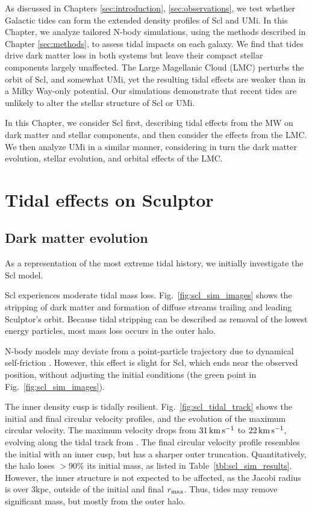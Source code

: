 As discussed in Chapters \ref{sec:introduction}, \ref{sec:observations},
we test whether Galactic tides can form the extended density profiles of
Scl and UMi. In this Chapter, we analyze tailored N-body simulations,
using the methods described in Chapter \ref{sec:methods}, to assess
tidal impacts on each galaxy. We find that tides drive dark matter loss
in both systems but leave their compact stellar components largely
unaffected. The Large Magellanic Cloud (LMC) perturbs the orbit of Scl,
and somewhat UMi, yet the resulting tidal effects are weaker than in a
Milky Way-only potential. Our simulations demonstrate that recent tides
are unlikely to alter the stellar structure of Scl or UMi.

In this Chapter, we consider Scl first, describing tidal effects from
the MW on dark matter and stellar components, and then consider the
effects from the LMC. We then analyze UMi in a similar manner,
considering in turn the dark matter evolution, stellar evolution, and
orbital effects of the LMC.

\section{Tidal effects on Sculptor}\label{tidal-effects-on-sculptor}

\subsection{Dark matter evolution}\label{dark-matter-evolution}

As a representation of the most extreme tidal history, we initially
investigate the \smallperi{} Scl model.

Scl experiences moderate tidal mass loss. Fig.~\ref{fig:scl_sim_images}
shows the stripping of dark matter and formation of diffuse streams
trailing and leading Sculptor's orbit. Because tidal stripping can be
described as removal of the lowest energy particles, most mass loss
occurs in the outer halo.

N-body models may deviate from a point-particle trajectory due to
dynamical self-friction \citep[e.g.,][]{miller+2020}. However, this
effect is slight for Scl, which ends near the observed position, without
adjusting the initial conditions (the green point in
Fig.~\ref{fig:scl_sim_images}).

The inner density cusp is tidally resilient.
Fig.~\ref{fig:scl_tidal_track} shows the initial and final circular
velocity profiles, and the evolution of the maximum circular velocity.
The maximum velocity drops from \(31\,{\rm km\,s^{-1}}\) to \(22\,{\rm km\,s^{-1}}\), evolving
along the tidal track from \citet{EN2021}. The final circular velocity
profile resembles the initial with an inner cusp, but has a sharper
outer truncation. Quantitatively, the halo loses \(>90\%\) its initial
mass, as listed in Table~\ref{tbl:scl_sim_results}. However, the inner
structure is not expected to be affected, as the Jacobi radius is over
3kpc, outside of the initial and final \(r_{\rm max}\). Thus, tides may remove
significant mass, but mostly from the outer halo.

